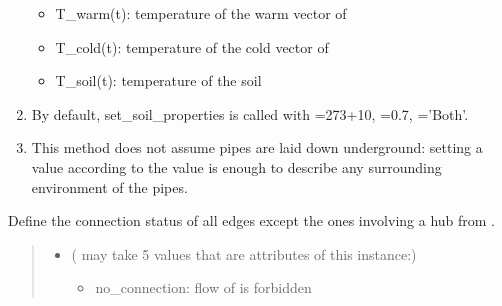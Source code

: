 \documentclass[letterpaper,10pt,english]{sphinxmanual}
\begin{document}
\begin{fulllineitems}
\begin{fulllineitems}
\begin{enumerate}
\begin{itemize}
\item {} 
\sphinxAtStartPar
T\_warm(t): temperature of the warm vector of 

\item {} 
\sphinxAtStartPar
T\_cold(t): temperature of the cold vector of 

\item {} 
\sphinxAtStartPar
T\_soil(t): temperature of the soil

\end{itemize}

\item {} 
\sphinxAtStartPar
By default, set\_soil\_properties is called with  =273+10,  =0.7,  =’Both’.

\item {} 
\sphinxAtStartPar
This method does not assume pipes are laid down underground: setting a  value according to the 
value is enough to describe any surrounding environment of the pipes.

\end{enumerate}

\end{fulllineitems}


\begin{fulllineitems}
\label{\detokenize{generated/tamos.network.ThermalNetwork:tamos.network.ThermalNetwork.set_status}}
\pysigstartsignatures
{}
\pysigstopsignatures
\sphinxAtStartPar
Define the connection status of all edges except the ones involving a hub from .
\begin{quote}\begin{description}
\begin{itemize}
\item {} 
\sphinxAtStartPar
{} ( may take 5 values that are attributes of this instance:) \textendash{} \begin{itemize}
\item {} 
\sphinxAtStartPar
no\_connection: flow of  is forbidden


\end{itemize}
\end{itemize}
\end{description}
\end{quote}
\end{fulllineitems}
\end{fulllineitems}
\end{document}

